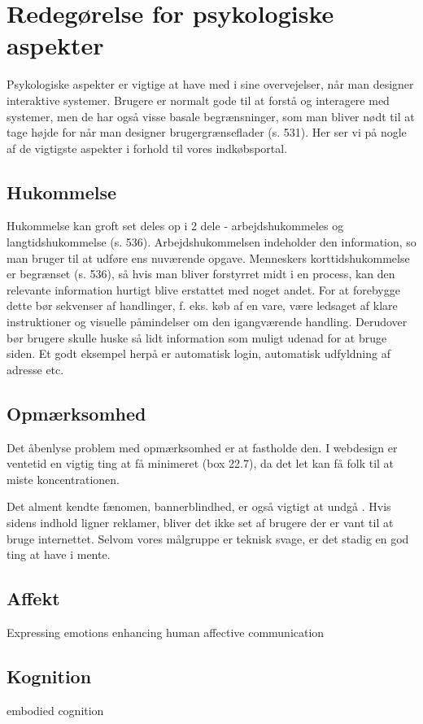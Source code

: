\section{Redegørelse for psykologiske aspekter}
Psykologiske aspekter er vigtige at have med i sine overvejelser, når man designer
interaktive systemer. Brugere er normalt gode til at forstå og interagere med systemer,
men de har også visse basale begrænsninger, som man bliver nødt til at tage højde for når
man designer brugergrænseflader (s. 531). Her ser vi på nogle af de vigtigste aspekter i forhold
til vores indkøbsportal.

\subsection{Hukommelse}
Hukommelse kan groft set deles op i 2 dele - arbejdshukommeles og langtidshukommelse (s. 536). Arbejdshukommelsen indeholder den
information, so man bruger til at udføre ens nuværende opgave. Menneskers korttidshukommelse er begrænset (s. 536), så hvis man bliver forstyrret
midt i en process, kan den relevante information hurtigt blive erstattet med noget andet. For at forebygge dette bør sekvenser af handlinger,
f. eks. køb af en vare, være ledsaget af klare instruktioner og visuelle påmindelser om den igangværende handling. Derudover bør brugere skulle
huske så lidt information som muligt udenad for at bruge siden. Et godt eksempel herpå er automatisk login, automatisk udfyldning af adresse etc.

\subsection{Opmærksomhed}
Det åbenlyse problem med opmærksomhed er at fastholde den. I webdesign er ventetid en vigtig ting at få minimeret (box 22.7), da det let kan
få folk til at miste koncentrationen. 

Det alment kendte fænomen, bannerblindhed, er også vigtigt at undgå \cite{Grue}. Hvis sidens indhold ligner reklamer, bliver det ikke set af
brugere der er vant til at bruge internettet. Selvom vores målgruppe er teknisk svage, er det stadig en god ting at have i mente.



\subsection{Affekt}
Expressing emotions
enhancing human affective communication


\subsection{Kognition}
embodied cognition



